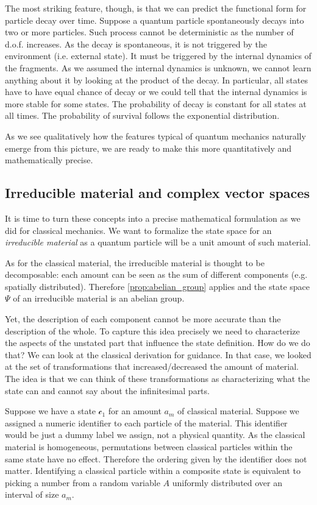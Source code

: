 \documentclass[aps,pra,10pt,twocolumn,floatfix,nofootinbib]{revtex4-1}
\numberwithin{equation}{section}
\theoremstyle{definition}
\begin{document}
The most striking feature, though, is that we can predict the functional form for particle decay over time. Suppose a quantum particle spontaneously decays into two or more particles. Such process cannot be deterministic as the number of d.o.f. increases. As the decay is spontaneous, it is not triggered by the environment (i.e. external state). It must be triggered by the internal dynamics of the fragments. As we assumed the internal dynamics is unknown, we cannot learn anything about it by looking at the product of the decay. In particular, all states have to have equal chance of decay or we could tell that the internal dynamics is more stable for some states. The probability of decay is constant for all states at all times. The probability of survival follows the exponential distribution.

As we see qualitatively how the features typical of quantum mechanics naturally emerge from this picture, we are ready to make this more quantitatively and mathematically precise.

\subsection{Irreducible material and complex vector spaces}

It is time to turn these concepts into a precise mathematical formulation as we did for classical mechanics. We want to formalize the state space for an \emph{irreducible material} as a quantum particle will be a unit amount of such material.

As for the classical material, the irreducible material is thought to be decomposable: each amount can be seen as the sum of different components (e.g. spatially distributed). Therefore \ref{prop:abelian_group} applies and the state space $\Psi$ of an irreducible material is an abelian group.

Yet, the description of each component cannot be more accurate than the description of the whole. To capture this idea precisely we need to characterize the aspects of the unstated part that influence the state definition. How do we do that? We can look at the classical derivation for guidance. In that case, we looked at the set of transformations that increased/decreased the amount of material. The idea is that we can think of these transformations as characterizing what the state can and cannot say about the infinitesimal parts.

Suppose we have a state $\mathcal{c}_1$ for an amount $a_m$ of classical material. Suppose we assigned a numeric identifier to each particle of the material. This identifier would be just a dummy label we assign, not a physical quantity. As the classical material is homogeneous, permutations between classical particles within the same state have no effect. Therefore the ordering given by the identifier does not matter. Identifying a classical particle within a composite state is equivalent to picking a number from a random variable $A$ uniformly distributed over an interval of size $a_m$.
\end{document}
